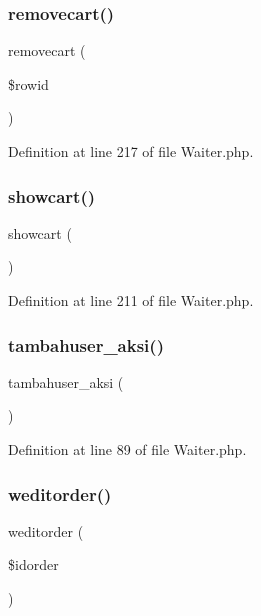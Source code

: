 \subsubsection{\texorpdfstring{removecart()}{removecart()}}
{\footnotesize\ttfamily removecart (\begin{DoxyParamCaption}\item[{}]{\$rowid }\end{DoxyParamCaption})}



Definition at line 217 of file Waiter.\+php.

\mbox{\label{class_waiter_a31e5e82d730a882fc93614c8e0878d2b}} 
\subsubsection{\texorpdfstring{showcart()}{showcart()}}
{\footnotesize\ttfamily showcart (\begin{DoxyParamCaption}{ }\end{DoxyParamCaption})}



Definition at line 211 of file Waiter.\+php.

\mbox{\label{class_waiter_aa1562702e41236c7d697146b2d3023aa}} 
\subsubsection{\texorpdfstring{tambahuser\_aksi()}{tambahuser\_aksi()}}
{\footnotesize\ttfamily tambahuser\+\_\+aksi (\begin{DoxyParamCaption}{ }\end{DoxyParamCaption})}



Definition at line 89 of file Waiter.\+php.

\mbox{\label{class_waiter_ae61f72c824f2e32119bc490231d75343}} 
\subsubsection{\texorpdfstring{weditorder()}{weditorder()}}
{\footnotesize\ttfamily weditorder (\begin{DoxyParamCaption}\item[{}]{\$idorder }\end{DoxyParamCaption})}




